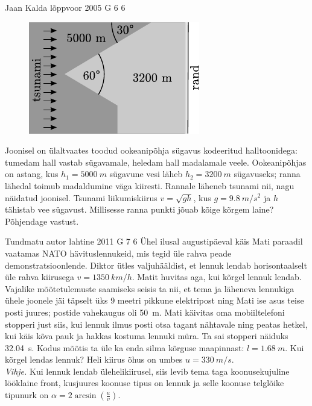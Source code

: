 \documentclass[11pt]{article}
\begin{document}
{%
{Jaan Kalda} %
{lõppvoor} %
{2005} %
{G 6} %
{6} %
{
\ifStatement
\begin{figure}
	\begin{center}
		\vspace{-20pt}
		\includegraphics[width=\linewidth]{2005-v3g-06-yl}
	\end{center}
\end{figure}

Joonisel on ülaltvaates toodud ookeanipõhja sügavus kodeeritud halltoonidega: tumedam hall vastab sügavamale, heledam hall madalamale veele. Ookeanipõhjas on astang, kus $h_1 = \SI{5000}{m}$ sügavune vesi läheb $h_2 = \SI{3200}{m}$ sügavuseks; ranna lähedal toimub madaldumine väga kiiresti. Rannale läheneb tsunami nii, nagu näidatud joonisel. Tsunami liikumiskiirus $v = \sqrt{gh}$, kus $g = \SI{9,8}{m/s^2}$ ja $h$ tähistab vee sügavust. Millisesse ranna punkti jõuab kõige kõrgem laine? Põhjendage vastust.
\fi
}

{Tundmatu autor} %
{lahtine} %
{2011} %
{G 7} %
{6} %
{
\ifStatement
Ühel ilusal augustipäeval käis Mati paraadil vaatamas NATO hävituslennukeid, mis
tegid üle rahva peade demonstratsioonlende. Diktor ütles valjuhääldist, et lennuk
lendab horisontaalselt üle rahva kiirusega $v=\SI{1350}{km/h}$. Matit huvitas aga, kui
kõrgel lennuk lendab. Vajalike mõõtetulemuste saamiseks seisis ta nii, et tema
ja läheneva lennukiga ühele joonele jäi täpselt üks 9 meetri pikkune elektripost
ning Mati ise asus teise posti juures; postide vahekaugus oli \SI{50}{m}. Mati käivitas oma
mobiiltelefoni stopperi just siis, kui lennuk ilmus posti otsa tagant nähtavale ning 
peatas hetkel, kui käis kõva pauk ja hakkas kostuma lennuki müra. Ta sai
stopperi näiduks \SI{32,04}{s}. Kodus
mõõtis ta üle ka enda silma kõrguse maapinnast: $l=\SI{1,68}{m}$.
Kui kõrgel lendas lennuk? Heli kiirus õhus on umbes
$u=\SI{330}{m/s}$.\\ 
\textit{Vihje.} Kui lennuk lendab
ülehelikiirusel, siis levib tema taga
koonusekujuline lööklaine front, kusjuures koonuse tipus on lennuk ja selle
koonuse telglõike
tipunurk on $\alpha=2\arcsin\left(\frac{u}{v}\right)$.
\fi
}

}
\end{document}
